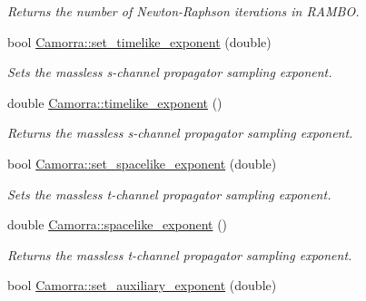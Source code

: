 \begin{DoxyCompactItemize}
\begin{DoxyCompactList}\small\item\em Returns the number of Newton-\/Raphson iterations in RAMBO. \end{DoxyCompactList}\item 
\hypertarget{a00831_a83d10ec4cad286691ac70f645fd18e97}{
bool \hyperlink{a00831_a83d10ec4cad286691ac70f645fd18e97}{Camorra::set\_\-timelike\_\-exponent} (double)}
\label{a00831_a83d10ec4cad286691ac70f645fd18e97}

\begin{DoxyCompactList}\small\item\em Sets the massless s-\/channel propagator sampling exponent. \end{DoxyCompactList}\item 
\hypertarget{a00831_a35d1bbad2438b461f5db90b09f6346bf}{
double \hyperlink{a00831_a35d1bbad2438b461f5db90b09f6346bf}{Camorra::timelike\_\-exponent} ()}
\label{a00831_a35d1bbad2438b461f5db90b09f6346bf}

\begin{DoxyCompactList}\small\item\em Returns the massless s-\/channel propagator sampling exponent. \end{DoxyCompactList}\item 
\hypertarget{a00831_a609c44713326ebf87fccec004210c119}{
bool \hyperlink{a00831_a609c44713326ebf87fccec004210c119}{Camorra::set\_\-spacelike\_\-exponent} (double)}
\label{a00831_a609c44713326ebf87fccec004210c119}

\begin{DoxyCompactList}\small\item\em Sets the massless t-\/channel propagator sampling exponent. \end{DoxyCompactList}\item 
\hypertarget{a00831_a287ab4732362246bdd4b763bd22e957f}{
double \hyperlink{a00831_a287ab4732362246bdd4b763bd22e957f}{Camorra::spacelike\_\-exponent} ()}
\label{a00831_a287ab4732362246bdd4b763bd22e957f}

\begin{DoxyCompactList}\small\item\em Returns the massless t-\/channel propagator sampling exponent. \end{DoxyCompactList}\item 
\hypertarget{a00831_af52f468c513e336f4721ffa4e9bc5e0f}{
bool \hyperlink{a00831_af52f468c513e336f4721ffa4e9bc5e0f}{Camorra::set\_\-auxiliary\_\-exponent} (double)}
\label{a00831_af52f468c513e336f4721ffa4e9bc5e0f}


\end{DoxyCompactItemize}
